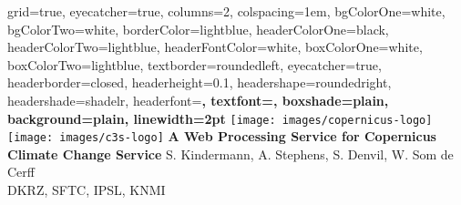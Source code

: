 \documentclass[portrait,final,a0paper,fontscale=0.277]{baposter}
\begin{document}


\begin{poster}%
  {
  grid=true,
  eyecatcher=true,
  columns=2,
  colspacing=1em,
  bgColorOne=white,
  bgColorTwo=white,
  borderColor=lightblue,
  headerColorOne=black,
  headerColorTwo=lightblue,
  headerFontColor=white,
  boxColorOne=white,
  boxColorTwo=lightblue,
  textborder=roundedleft,
  eyecatcher=true,
  headerborder=closed,
  headerheight=0.1\textheight,
  headershape=roundedright,
  headershade=shadelr,
  headerfont=\Large\bf\textsc, %
  textfont={\setlength{\parindent}{1.5em}},
  boxshade=plain,
  background=plain,
  linewidth=2pt
  }
  {
    \texttt{[image: images/copernicus-logo]}
    \texttt{[image: images/c3s-logo]}
  }
  {\sf\bf
          A Web Processing Service for Copernicus Climate Change Service
  }
  {
    \vspace{1em} S. Kindermann, A. Stephens, S. Denvil, W. Som de Cerff\\
    {\smaller DKRZ, SFTC, IPSL, KNMI}
  }
  {
  \setlength\fboxsep{0pt}
  \setlength\fboxrule{0.5pt}
  }


\end{poster}
\end{document}
